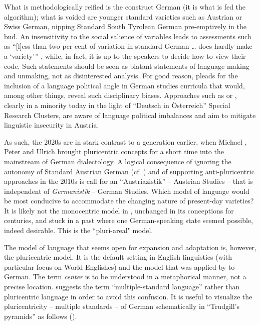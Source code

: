 \documentclass[output=paper]{langscibook}
\begin{document}
What is methodologically reified is the construct German (it is what is fed the algorithm); what is voided are younger standard varieties such as Austrian or Swiss German, nipping Standard South Tyrolean German pre-emptively in the bud. An insensitivity to the social salience of variables leads to assessments such as “[l]ess than two per cent of variation in standard German … does hardly make a ‘variety’” \citep[50]{ElspaßNiehaus2014}, while, in fact, it is up to the speakers to decide how to view their code. Such statements should be seen as blatant statements of language making and unmaking, not as disinterested analysis. For good reason, \citet[383]{Ruck2023} pleads for the inclusion of a language political angle in German studies curricula that would, among other things, reveal such disciplinary biases. Approaches such as \citet{Muhr2017} or \citet{DeCilliaRansmayr2019}, clearly in a minority today in the light of ``Deutsch in Österreich'' Special Research Clusters, are aware of language political imbalances and aim to mitigate linguistic insecurity in Austria.

As such, the 2020s are in stark contrast to a generation earlier, when Michael \citet{Clyne1995}, Peter \citet{vonPolenz1994} and Ulrich \citet{Ammon1995} brought pluricentric concepts for a short time into the mainstream of German dialectology. A logical consequence of ignoring the autonomy of Standard Austrian German (cf. \citealt[9--12]{ChambersTrudgill1998}) and of supporting anti-pluricentric approaches in the 2010s is  call for an ``Austriazistik'' – Austrian Studies – that is independent of \textit{Germanistik} – German Studies. Which model of language would be most conducive to accommodate the changing nature of present-day varieties? It is likely not the monocentric model in , unchanged in its conceptions for centuries, and stuck in a past where one German-speaking state seemed possible, indeed desirable. This is the ``pluri-areal" model.

 The model of language that seems open for expansion and adaptation is, however, the pluricentric model. It is the default setting in English linguistics (with particular focus on World Englishes) and the model that was applied by \citet{Clyne1995} to German. The term \textit{center} is to be understood in a metaphorical manner, not a precise location. \citet{Auer2021} suggests the term “multiple-standard language” rather than pluricentric language in order to avoid this confusion. It is useful to visualize the pluricentricity -- multiple standards -- of German schematically in “Trudgill’s pyramids” as follows ().
\end{document}

